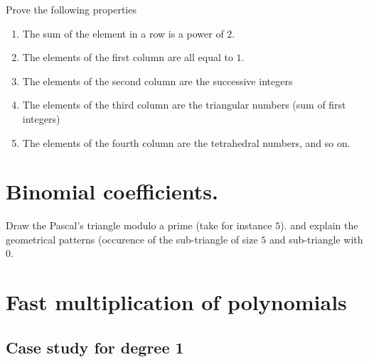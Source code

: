 \documentclass{article}[12pt]
\begin{document}
Prove the following properties

\begin{enumerate}
\item The sum of the element in a row is a power of $2$.
\item 
The elements of the first column are all equal to $1$.
\item  The elements of the second column are the successive integers
\item The elements of the third column are the triangular numbers (sum of first integers)
\item The elements of the fourth column are the tetrahedral numbers, and so on.
\end{enumerate}



\section{Binomial coefficients.}


Draw the Pascal's triangle modulo a prime (take for instance $5$).
and explain the geometrical patterns (occurence of the sub-triangle of size $5$ and sub-triangle with $0$.


\section{Fast multiplication of polynomials}


\subsection{Case study for degree 1}
\end{document}
